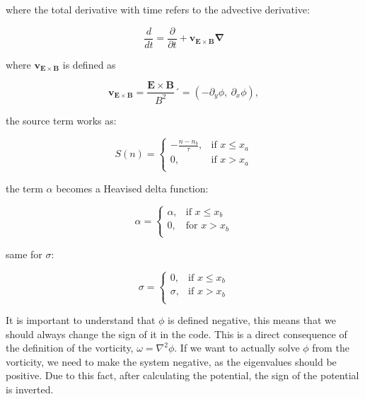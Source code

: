 \documentclass{hitec} %
\begin{document}
where the total derivative with time refers to the advective derivative:

\begin{equation}
\frac{d}{dt} = \frac{\partial}{\partial t} + \boldsymbol{v_{E\times B} \nabla}
\end{equation}

where $\boldsymbol{v_{E\times B}}$ is defined as

\begin{equation}
\boldsymbol{v_{E\times B}} = \frac{\boldsymbol{E\times B}}{ B^2}´ = (-\partial_y\phi,~\partial_x\phi),
\end{equation}

the source term works as:

\begin{equation}
S(n) = 
 \left\{\begin{array}{lr}
        -\frac{n - n_b}{\tau}, & \text{if } x\leq x_a\\
        0, & \text{if } x > x_a\\
        \end{array}\right.
\end{equation}

the term $\alpha$ becomes a Heavised delta function:

\begin{equation}
\alpha =  
 \left\{\begin{array}{lr}
        \alpha, & \text{if } x\leq x_b\\
        0, & \text{for } x > x_b\\
        \end{array}\right.
\end{equation}

same for $\sigma$:

\begin{equation}
\sigma =  
 \left\{\begin{array}{lr}
        0, & \text{if } x\leq x_b\\
        \sigma, & \text{if } x > x_b\\
        \end{array}\right.
\end{equation}


It is important to understand that $\phi$ is defined negative, this means that we should always change the sign of it in the code. This is a direct consequence of the definition of the vorticity, $\omega = \nabla^2\phi$. If we want to actually solve $\phi$ from the vorticity, we need to make the system negative, as the eigenvalues should be positive. Due to this fact, after calculating the potential, the sign of the potential is inverted.
\end{document}
